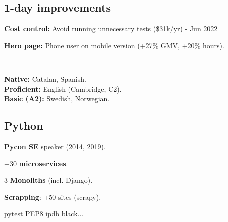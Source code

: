 \documentclass[a4paper]{MagicalCV}
\begin{document}
\begin{minipage}[t]{0.33\textwidth}
\subsection{1-day improvements}
\begin{tightemize}
\item {\bf Cost control: } Avoid running unnecessary tests (\$31k/yr) - Jun 2022
\item {\bf Hero page: } Phone user on mobile version (+27\% GMV, +20\% hours).

\end{tightemize}
\sectionsep


\sectionsep

\vspace{\topsep} %

\sectionsep
{}
\sectionsep

 \\
\sectionsep

\textbf{Native: } Catalan, Spanish. \\
\textbf{Proficient: } English (Cambridge, C2). \\
\textbf{Basic (A2): } Swedish, Norwegian.\\
\sectionsep

\sectionsep
\subsection{Python}
\begin{tightemize}
\item {\bf Pycon SE} speaker (2014, 2019). %
\item +30 {\bf microservices}.
\item 3 {\bf Monoliths} (incl. Django).
\item {\bf Scrapping}: +50 sites (scrapy).
\item pytest \textbullet{} PEP8 \textbullet{} ipdb \textbullet{} black...
\end{tightemize}
\sectionsep
\sectionsep


\end{minipage}
\end{document}
